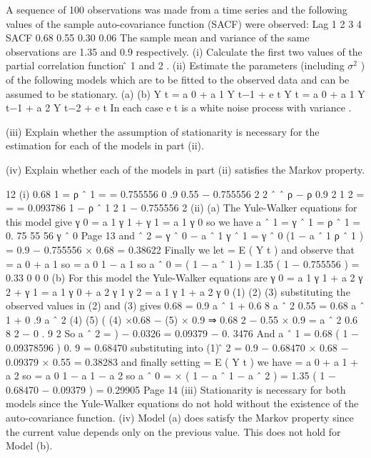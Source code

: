 \documentclass[a4paper,12pt]{article}
\begin{document}
\begin{enumerate}

A sequence of 100 observations was made from a time series and the following values
of the sample auto-covariance function (SACF) were observed:
Lag
1
2
3
4
SACF
0.68
0.55
0.30
0.06
The sample mean and variance of the same observations are 1.35 and 0.9 respectively.
(i) Calculate the first two values of the partial correlation function \phî 1 and \hat{\phi} 2 . 
(ii) Estimate the parameters (including $\sigma^2$ ) of the following models which are to
be fitted to the observed data and can be assumed to be stationary.
(a)
(b)
Y t = a 0 + a 1 Y t−1 + e t
Y t = a 0 + a 1 Y t−1 + a 2 Y t−2 + e t
In each case e t is a white noise process with variance  .

(iii) Explain whether the assumption of stationarity is necessary for the estimation
for each of the models in part (ii).

(iv) Explain whether each of the models in part (ii) satisfies the Markov property.

\newpage

12
(i)
0.68
\hat{\phi} 1 = ρ ˆ 1 =
= 0.755556
0 .9
0.55
− 0.755556 2
2
ˆ
ˆ
ρ
−
ρ
0.9
2
1
\hat{\phi} 2 =
=
= 0.093786
1 − ρ ˆ 1 2
1 − 0.755556 2
(ii)
(a)
The Yule-Walker equations for this model give
γ 0 = a 1 γ 1 + 
γ 1 = a 1 γ 0
so we have a ˆ 1 =
γ ˆ 1
= ρ ˆ 1 = 0. 75 55 56
γ ˆ 0
Page 13%
and \sigma ˆ 2 = γ ˆ 0 − a ˆ 1 γ ˆ 1 = γ ˆ 0 (1 − a ˆ 1 ρ ˆ 1 )
= 0.9 − 0.755556 × 0.68 = 0.38622
Finally we let \mu = E ( Y t ) and observe that
\mu = a 0 + a 1 \mu
so \mu =
a 0
1 − a 1
so a ˆ 0 = \hat{\mu} ( 1 − a ˆ 1 ) = 1.35 ( 1 − 0.755556 ) = 0.33 0 0 0
(b)
For this model the Yule-Walker equations are
γ 0 = a 1 γ 1 + a 2 γ 2 + 
γ 1 = a 1 γ 0 + a 2 γ 1
γ 2 = a 1 γ 1 + a 2 γ 0
(1)
(2)
(3)
substituting the observed values in (2) and (3) gives
0.68 = 0.9 a ˆ 1 + 0.6 8 a ˆ 2
0.55 = 0.68 a ˆ 1 + 0 .9 a ˆ 2
(4)
(5)
(
(4) ×0.68 − (5) × 0.9 ⇒ 0.68 2 − 0.55 × 0.9 = a ˆ 2 0.6 8 2 − 0 . 9 2
So a ˆ 2 =
)
− 0.0326
= 0.09379
− 0. 3476
And a ˆ 1 =
0.68 ( 1 − 0.09378596 )
0. 9
= 0.68470
substituting into (1)
\sigmâ 2 = 0.9 − 0.68470 × 0.68 − 0.09379 × 0.55 = 0.38283
and finally setting \mu = E ( Y t ) we have \mu = a 0 + a 1 \mu + a 2 \mu
so \mu =
a 0
1 − a 1 − a 2
so a ˆ 0 = \hat{\mu} × ( 1 − a ˆ 1 − a ˆ 2 ) = 1.35 ( 1 − 0.68470 − 0.09379 ) = 0.29905
Page 14%
(iii) Stationarity is necessary for both models since the Yule-Walker equations do
not hold without the existence of the auto-covariance function.
(iv) Model (a) does satisfy the Markov property since the current value depends
only on the previous value.
This does not hold for Model (b).


\end{enumerate}
\end{document}
